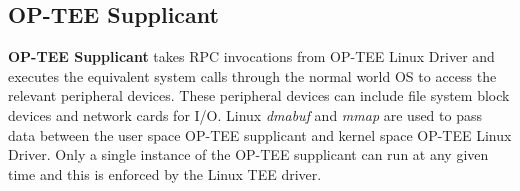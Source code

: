 



\subsection{OP-TEE Supplicant}

\textbf{OP-TEE Supplicant} takes RPC invocations from OP-TEE Linux Driver and executes the equivalent 
system calls through the normal world OS to access the relevant peripheral devices. These peripheral 
devices can include file system block devices and network cards for I/O. 
Linux \textit{dmabuf} and \textit{mmap} are used to pass data between the user space
OP-TEE supplicant and kernel space OP-TEE Linux Driver. 
Only a single instance of the OP-TEE supplicant 
can run at any given time and this is enforced by the Linux TEE driver.